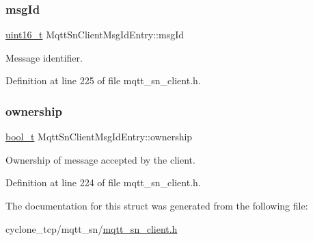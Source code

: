 \subsubsection{\texorpdfstring{msg\+Id}{msgId}}
{\footnotesize\ttfamily \hyperlink{stdint_8h_a273cf69d639a59973b6019625df33e30}{uint16\+\_\+t} Mqtt\+Sn\+Client\+Msg\+Id\+Entry\+::msg\+Id}



Message identifier. 



Definition at line 225 of file mqtt\+\_\+sn\+\_\+client.\+h.

\mbox{\label{structMqttSnClientMsgIdEntry_ab580cf58e322c49df34e13e7ef5e9836}} 
\subsubsection{\texorpdfstring{ownership}{ownership}}
{\footnotesize\ttfamily \hyperlink{compiler__port_8h_a812d16e5494522586b3784e55d479912}{bool\+\_\+t} Mqtt\+Sn\+Client\+Msg\+Id\+Entry\+::ownership}



Ownership of message accepted by the client. 



Definition at line 224 of file mqtt\+\_\+sn\+\_\+client.\+h.



The documentation for this struct was generated from the following file\+:\begin{DoxyCompactItemize}
\item 
cyclone\+\_\+tcp/mqtt\+\_\+sn/\hyperlink{mqtt__sn__client_8h}{mqtt\+\_\+sn\+\_\+client.\+h}\end{DoxyCompactItemize}

